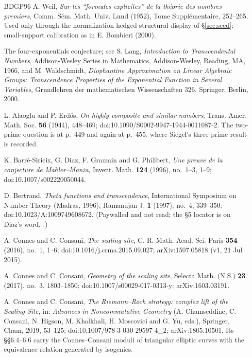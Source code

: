 \documentclass[11pt]{article}
\theoremstyle{definition}
\theoremstyle{remark}
\begin{document}
\begin{thebibliography}{BDGP96}
 A. Weil, \emph{Sur les ``formules explicites'' de la
th\'eorie des nombres premiers}, Comm. S\'em. Math. Univ. Lund (1952),
Tome Suppl\'ementaire, 252--265. Used only through the
normalization-hedged structural display of \S\ref{sec:seed}; small-support
calibration as in E. Bombieri (2000).

 The four-exponentials conjecture; see S. Lang,
\emph{Introduction to Transcendental Numbers}, Addison-Wesley Series in
Mathematics, Addison-Wesley, Reading, MA, 1966, and M. Waldschmidt,
\emph{Diophantine Approximation on Linear Algebraic Groups: Transcendence
Properties of the Exponential Function in Several Variables}, Grundlehren
der mathematischen Wissenschaften 326, Springer, Berlin, 2000.

 L. Alaoglu and P. Erd\H{o}s, \emph{On highly composite
and similar numbers}, Trans. Amer. Math. Soc. \textbf{56} (1944), 448--469;
doi:10.1090/S0002-9947-1944-0011087-2. The two-prime question is at p.~449 and
again at p.~455, where Siegel's three-prime result is recorded.

 K. Barr\'e-Sirieix, G. Diaz, F. Gramain and
G. Philibert, \emph{Une preuve de la conjecture de Mahler--Manin},
Invent. Math. \textbf{124} (1996), no.~1--3, 1--9; doi:10.1007/s002220050044.

 D. Bertrand, \emph{Theta functions and transcendence},
International Symposium on Number Theory (Madras, 1996), Ramanujan J.
\textbf{1} (1997), no.~4, 339--350; doi:10.1023/A:1009749608672.
(Paywalled and not read; the \S5 locator is on Diaz's word, \cite[p.~231 and
bibliography item 2]{Dia97}.)

 A. Connes and C. Consani, \emph{The scaling site},
C. R. Math. Acad. Sci. Paris \textbf{354} (2016), no.~1, 1--6;
doi:10.1016/j.crma.2015.09.027; arXiv:1507.05818 (v1, 21 Jul 2015).

 A. Connes and C. Consani, \emph{Geometry of the scaling
site}, Selecta Math. (N.S.) \textbf{23} (2017), no.~3, 1803--1850;
doi:10.1007/s00029-017-0313-y; arXiv:1603.03191.

 A. Connes and C. Consani, \emph{The Riemann--Roch
strategy: complex lift of the Scaling Site}, in: \emph{Advances in
Noncommutative Geometry} (A. Chamseddine, C. Consani, N. Higson, M. Khalkhali,
H. Moscovici and G. Yu, eds.), Springer, Cham, 2019, 53--125;
doi:10.1007/978-3-030-29597-4\_2; arXiv:1805.10501. Its \S\S6.4--6.6 carry the
Connes--Consani moduli of triangular elliptic curves with the equivalence
relation generated by isogenies.


\end{thebibliography}
\end{document}
